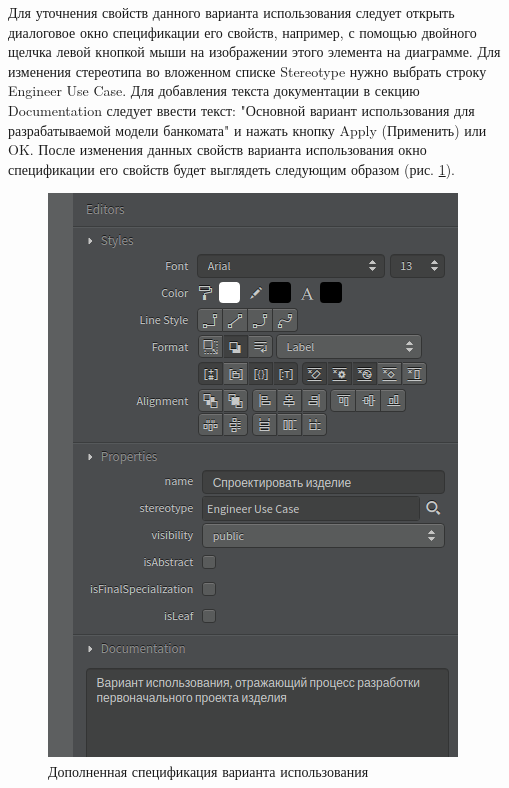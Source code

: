\documentclass[a4paper,12pt]{report}
\begin{document}
Для уточнения свойств данного варианта использования следует открыть диалоговое окно спецификации его свойств, например, с помощью двойного щелчка левой кнопкой мыши на изображении этого элемента на диаграмме. Для изменения стереотипа во вложенном списке Stereotype нужно выбрать строку Engineer Use Case. Для добавления текста документации в секцию Documentation следует ввести текст: "Основной вариант использования для разрабатываемой модели банкомата" и нажать кнопку Apply (Применить) или OK. После изменения данных свойств варианта использования окно спецификации его свойств будет выглядеть следующим образом (рис. \ref{fig:actioneditors}).


\begin{figure}[h!]
	\centering
	\includegraphics[width=0.4\linewidth]{images/actioneditors}
	\caption{Дополненная спецификация варианта использования}
	\label{fig:actioneditors}
\end{figure}
\end{document}
